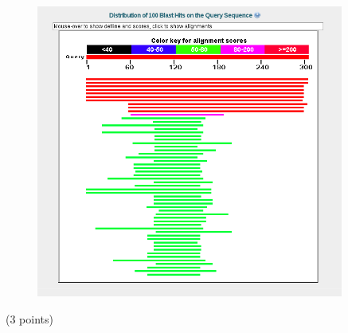 \documentclass[11pt]{article}
\begin{document}
\begin{enumerate}
\begin{figure}[H]
    \includegraphics[width=0.9\textwidth]{images/blast_result_image}
  \end{figure}
  (3 points)
\end{enumerate}
\end{document}
